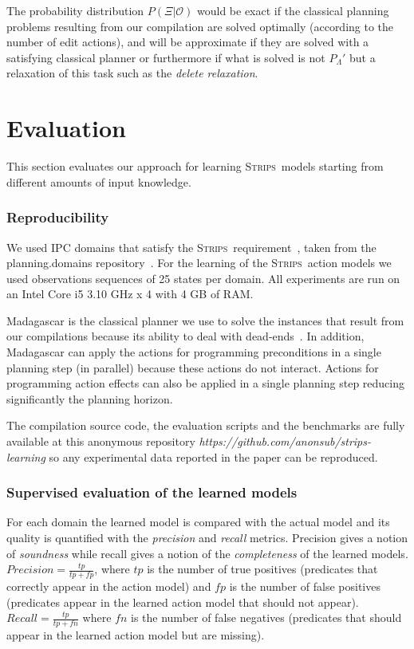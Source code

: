 \documentclass{article}
\newcommand{\strips}{\textsc{Strips}}     %
\begin{document}
The probability distribution $P(\Xi|\mathcal{O})$ would be exact if the classical planning problems resulting from our compilation are solved optimally (according to the number of edit actions), and will be approximate if they are solved with a satisfying classical planner or furthermore if what is solved is not $P_{\Lambda}'$ but a relaxation of this task such as the {\em delete relaxation}.


\section{Evaluation}
This section evaluates our approach for learning \strips\ models starting from different amounts of input knowledge.

\subsubsection{Reproducibility}
We used IPC domains that satisfy the \strips\ requirement~\cite{fox2003pddl2}, taken from the {\sc planning.domains} repository~\cite{muise2016planning}. For the learning of the \strips\ action models we used observations sequences of 25 states per domain. All experiments are run on an Intel Core i5 3.10 GHz x 4 with 4 GB of RAM.

{\sc Madagascar} is the classical planner we use to solve the instances that result from our compilations because its ability to deal with dead-ends~\cite{rintanen2014madagascar}. In addition, {\sc Madagascar} can apply the actions for programming preconditions in a single planning step (in parallel) because these actions do not interact. Actions for programming action effects can also be applied in a single planning step reducing significantly the planning horizon.

The compilation source code, the evaluation scripts and the benchmarks are fully available at this anonymous repository {\em https://github.com/anonsub/strips-learning} so any experimental data reported in the paper can be reproduced.

\subsubsection{Supervised evaluation of the learned models}
For each domain the learned model is compared with the actual model and its quality is quantified with the {\em precision} and {\em recall} metrics. Precision gives a notion of {\em soundness} while recall gives a notion of the {\em completeness} of the learned models. $Precision=\frac{tp}{tp+fp}$, where $tp$ is the number of true positives (predicates that correctly appear in the action model) and $fp$ is the number of false positives (predicates appear in the learned action model that should not appear). $Recall=\frac{tp}{tp+fn}$ where $fn$ is the number of false negatives (predicates that should appear in the learned action model but are missing).
\end{document}
